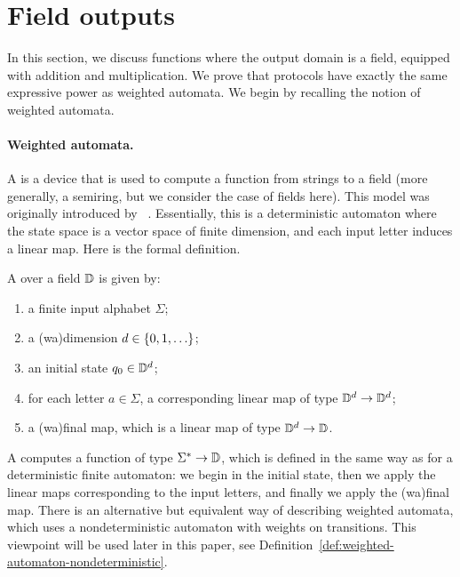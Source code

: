 \section{Field outputs}
\label{sec:field-domain}
In this section, we discuss functions where the output domain is a field, equipped with addition and multiplication. We prove that protocols have  exactly the same expressive power as weighted automata.
We begin by recalling the notion of weighted automata.

\paragraph*{Weighted automata.} \AP A  is a device that
is used to compute a function from strings to a field (more generally, a
semiring, but we consider the case of fields here). This model was originally
introduced by \schutz~\cite{schutzenberger1961definition}. Essentially, this is
a deterministic automaton where the state space is a vector space of finite
dimension, and each input letter induces a linear map. Here is the formal
definition. 

\begin{definition}
    \label{def:weighted-automaton}
    \AP
    A  over a field $\mathbb D$ is given by: 
    \begin{enumerate}
        \item a finite input alphabet $\Sigma$;
        \item a \intro(wa){dimension} $d \in \{0,1,\ldots\}$;
        \item an initial state $q_0 \in \mathbb D^d$;
        \item \label{it:weighted-definition-transitions} 
          for each letter $a \in \Sigma$, a 
          corresponding linear map of type $\mathbb D^d \to \mathbb D^d$;
        \item \label{it:weighted-definition-final} a \intro(wa){final map},
          which is a linear map of type $\mathbb D^d \to \mathbb D$. 
    \end{enumerate}
\end{definition}

A  computes a function of type $\Sigma^* \to \mathbb D$,
which is defined in the same way as for a deterministic finite automaton: we
begin in the initial state, then we apply the linear maps corresponding to the
input letters, and finally we apply the \kl(wa){final map}. There is an
alternative but equivalent way of describing weighted automata, which uses a
nondeterministic automaton with weights on transitions. This viewpoint will be
used later in this paper, see
Definition~\ref{def:weighted-automaton-nondeterministic}.

